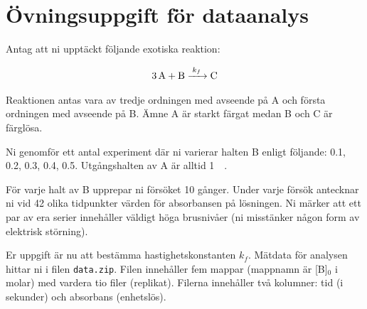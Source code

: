 \section{Övningsuppgift för dataanalys}
\label{sec:exercise}
Antag att ni upptäckt följande exotiska reaktion:

\begin{align}
  \label{eq:fourth-order}
  \ce{3A + B ->[k_f] C}
\end{align}

Reaktionen antas vara av tredje ordningen med avseende på A och första
ordningen med avseende på B. Ämne A är starkt färgat medan B och C är
färglösa.

Ni genomför ett antal experiment där ni varierar halten B enligt
följande: \SI{0.1}{\Molar}, \SI{0.2}{\Molar}, \SI{0.3}{\Molar}, \SI{0.4}{\Molar},
\SI{0.5}{\Molar}. Utgångshalten av A är alltid \SI{1}{\milli\Molar}.

För varje halt av B upprepar ni försöket 10 gånger. Under varje försök
antecknar ni vid 42 olika tidpunkter värden för absorbansen på lösningen.
Ni märker att ett par av era serier innehåller väldigt höga brusnivåer
(ni misstänker någon form av elektrisk störning).

Er uppgift är nu att bestämma hastighetskonstanten $k_f$. Mätdata för
analysen hittar ni i filen {\tt data.zip}. Filen innehåller fem mappar
(mappnamn är [B]$_0$ i molar) med vardera tio filer (replikat). Filerna
innehåller två kolumner: tid (i sekunder) och absorbans (enhetslös).

